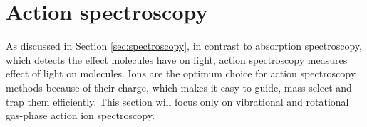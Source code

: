 \section{Action spectroscopy}
\label{sec:action-spectroscopy}

As discussed in Section \ref{sec:spectroscopy}, in contrast to absorption
spectroscopy, which detects the effect molecules have on light, action
spectroscopy measures effect of light on molecules. Ions are the optimum choice
for action spectroscopy methods because of their charge, which makes it easy to
guide, mass select and trap them efficiently. This section will focus only on
vibrational and rotational gas-phase action ion spectroscopy.


